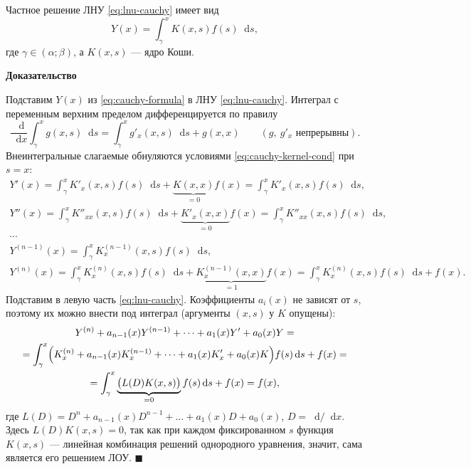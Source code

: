 \documentclass[12pt,a4paper]{article}
\numberwithin{equation}{section}
\newcommand{\dd}{\mathop{}\!\mathrm{d}}
\renewenvironment{proof}[1][Доказательство]{\begin{center}\textbf{#1}\end{center}}{\hfill$\blacksquare$\par}
\begin{document}
\begin{center}
\end{center}

\begin{theoremHSE}
Частное решение ЛНУ \eqref{eq:lnu-cauchy} имеет вид
\begin{equation}
Y(x)=\int_\gamma^x K(x,s)f(s)\dd s,
\label{eq:cauchy-formula}
\end{equation}
где \(\gamma\in(\alpha;\beta)\), а \(K(x,s)\) --- ядро Коши.
\end{theoremHSE}

\begin{proof}
Подставим \(Y(x)\) из \eqref{eq:cauchy-formula} в ЛНУ \eqref{eq:lnu-cauchy}. Интеграл с переменным верхним пределом дифференцируется по правилу
\[
\frac{\dd}{\dd x}\int_\gamma^x g(x,s)\dd s=\int_\gamma^x g'_x(x,s)\dd s+g(x,x)
\qquad(g,\ g'_x\text{ непрерывны}).
\]
Внеинтегральные слагаемые обнуляются условиями \eqref{eq:cauchy-kernel-cond} при \(s=x\):
\begin{gather*}
Y'(x)=\int_\gamma^x K'_x(x,s)f(s)\dd s+\underbrace{K(x,x)}_{=0}f(x)=\int_\gamma^x K'_x(x,s)f(s)\dd s,\\
Y''(x)=\int_\gamma^x K''_{xx}(x,s)f(s)\dd s+\underbrace{K'_x(x,x)}_{=0}f(x)=\int_\gamma^x K''_{xx}(x,s)f(s)\dd s,\\
\cdots\\
Y^{(n-1)}(x)=\int_\gamma^x K^{(n-1)}_x(x,s)f(s)\dd s,\\
Y^{(n)}(x)=\int_\gamma^x K^{(n)}_x(x,s)f(s)\dd s+\underbrace{K^{(n-1)}_x(x,x)}_{=1}f(x)=\int_\gamma^x K^{(n)}_x(x,s)f(s)\dd s+f(x).
\end{gather*}
Подставим в левую часть \eqref{eq:lnu-cauchy}. Коэффициенты \(a_i(x)\) не зависят от \(s\), поэтому их можно внести под интеграл (аргументы \((x,s)\) у \(K\) опущены):
\begin{gather*}
Y^{(n)}+a_{n-1}(x)Y^{(n-1)}+\cdots+a_1(x)Y'+a_0(x)Y=\\
=\int_\gamma^x\Bigl(K^{(n)}_x+a_{n-1}(x)K^{(n-1)}_x+\cdots+a_1(x)K'_x+a_0(x)K\Bigr)f(s)\dd s+f(x)=\\
=\int_\gamma^x\underbrace{\bigl(L(D)K(x,s)\bigr)}_{=0}f(s)\dd s+f(x)=f(x),
\end{gather*}
где \(L(D)=D^n+a_{n-1}(x)D^{n-1}+\ldots+a_1(x)D+a_0(x)\), \(D={\dd}/{\dd x}\). Здесь \(L(D)K(x,s)=0\), так как при каждом фиксированном \(s\) функция \(K(x,s)\) --- линейная комбинация решений однородного уравнения, значит, сама является его решением ЛОУ.
\end{proof}
\end{document}
